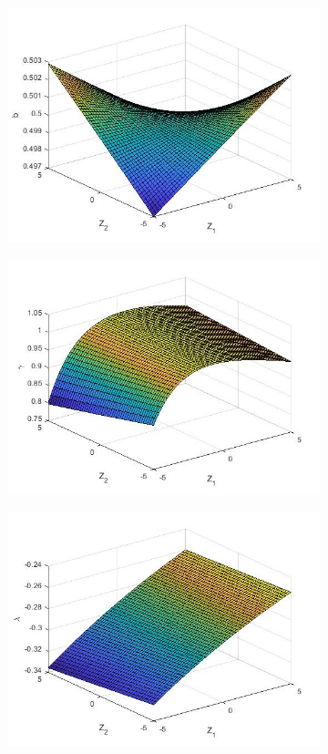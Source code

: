 \documentclass[12pt]{article}
\begin{document}
\begin{figure}[H]
\begin{subfigure}{0.49\textwidth}
\includegraphics[width=0.9\linewidth]{b_s2.jpg} 
\end{subfigure}
\begin{subfigure}{0.49\textwidth}
\includegraphics[width=0.9\linewidth]{gamma_s2.jpg}
\end{subfigure}
\begin{center}
\begin{subfigure}{0.5\textwidth}
\includegraphics[width=0.9\linewidth]{lambda_s2.jpg} 

\end{subfigure}
\end{center}
\end{figure}
\end{document}
